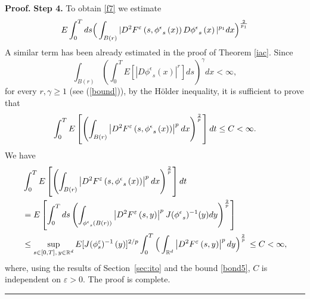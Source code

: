 \documentclass[a4paper,11pt]{article}
\newenvironment{proof}[1][Proof]{\textbf{#1.} }{\ \rule{0.5em}{0.5em}}
\newcommand{\RR}{\mathbb{R}}
\newcommand{\eps}{\varepsilon}
\begin{document}
\begin{proof}
\medskip \noindent \textbf{Step 4.}
 To obtain \eqref{f7} we estimate
\begin{equation*}
E\int_{0}^{T}ds\Big (\int_{B(r)}|D^{2}F^{\varepsilon }\left( s,{{{\phi}^{\epsilon}} }%
_{s}\left( x\right) \right) D{{{\phi}^{\epsilon}} }_{s}\left( x\right) |^{p_{1}}dx\Big )^{%
\frac{2}{p_{1}}}
\end{equation*}
A similar term has been already estimated in the proof of Theorem
\ref{iac}. Since
\begin{equation*}
\int_{B(r)}\left( \int_{0}^{T}E\left[ \left| D{{{\phi}^{\epsilon}}
}_{s}\left( x\right) \right| ^{r}\right] ds\right) ^{\gamma
}dx<\infty ,
\end{equation*}
for every $r,\gamma \geq 1$ (see (\ref{bound})), by the H\"{o}lder
inequality, it is sufficient to prove that
\begin{equation*}
\int_{0}^{T}E\left[ \left( \int_{B(r)}\left| D^{2}F^{\varepsilon }\left( s,{%
{{\phi}^{\epsilon}} }_{s}
\left( x\right) \right) \right| ^{p^{}}dx\right) ^{\frac{2}{%
p^{ }}}\right] dt \le C <\infty.
\end{equation*}
  We have
\begin{align*}
& \int_{0}^{T}E\left[ \left( \int_{B(r)}\left| D^{2}F^{\varepsilon }
\left( s,{%
{{\phi}^{\epsilon}} }_{s}\left( x\right) \right) \right|^{p^{}}dx\right) ^{\frac{2}{%
p^{ }}}\right] dt \\
& =E\left[ \int_{0}^{T}ds\left( \int_{{{\phi}^{\epsilon}}
_{s}(B(r))}\left| D^{2}F^{\varepsilon }\left( s,{y}\right) \right|
^{p^{}}J({{\phi}^{\epsilon}}
_{s})^{-1}(y)dy\right) ^{\frac{2}{p^{ }}}\right]  \\
& \leq \sup_{s \in [0,T] , \, y \in \RR^d}
   E[ J (\phi_s^{\eps})^{-1}\, (y)]^{2/p}
\int_{0}^{T}\Big (\int_{\mathbb{R}^d}\left| D^{2}F^{\varepsilon
}\left( s,{y}\right) \right| ^{p}dy\Big )^{\frac{2}{p}}\, \le C <
\infty,
\end{align*}
where, using  the results of Section~\ref{sec:ito} and the bound \eqref{bond5},
$C$ is independent on $\eps>0.$ The proof  is complete.
\end{proof}
\end{document}
